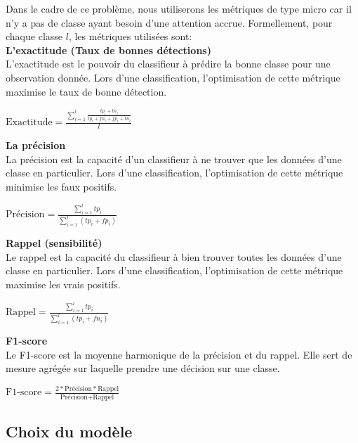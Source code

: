 Dans le cadre de ce problème, nous utiliserons les métriques de type micro car il n'y a pas de classe ayant besoin d'une attention accrue. Formellement, pour chaque classe $l$, les métriques utilisées sont: \\

\textbf{L'exactitude (Taux de bonnes détections)}\\
L'exactitude est le pouvoir du classifieur à prédire la bonne classe pour une observation donnée.  Lors d'une classification, l'optimisation de cette métrique maximise le taux de bonne détection.\\
\begin{center}
	$\textrm{Exactitude} = \frac{\sum_{i=1}^{l} \frac{tp_i +tn_i}{tp_i + fn_i + fp_i+ tn_i}}{l}$
\end{center}

\textbf{La précision}\\
La précision est la capacité d'un classifieur à ne trouver que les données d'une classe en particulier. Lors d'une classification, l'optimisation de cette métrique minimise les faux positifs.\\
\begin{center}
	$\textrm{Précision} = \frac{\sum_{i=1}^{l} tp_i}{\sum_{i=1}^{l} (tp_i + fp_i)}$
\end{center}

\textbf{Rappel (sensibilité)}\\
Le rappel est la capacité du classifieur à bien trouver toutes les données d'une classe en particulier. Lors d'une classification, l'optimisation de cette métrique maximise les vrais positifs.\\
\begin{center}
	$\textrm{Rappel} = \frac{\sum_{i=1}^{l} tp_i}{\sum_{i=1}^{l} (tp_i + fn_i)}$
\end{center}

\textbf{F1-score}\\
Le F1-score est la moyenne harmonique de la précision et du rappel. Elle sert de mesure agrégée sur laquelle prendre une décision sur une classe.\\	
\begin{center}
	$\textrm{F1-score} = \frac{2 * \textrm{Précision} * \textrm{Rappel}}{\textrm{Précision} + \textrm{Rappel}}$ 
\end{center}

\subsection{Choix du modèle}

